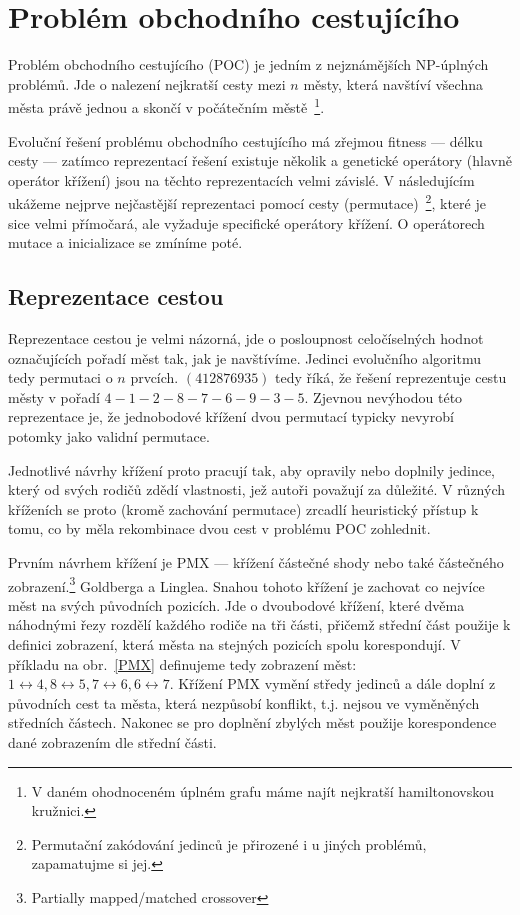 %
%

\section{Problém obchodního cestujícího}

Problém obchodního cestujícího (POC) je jedním z nejznámějších NP-úplných problémů. Jde o nalezení nejkratší cesty mezi $n$ městy, která navštíví všechna města právě jednou a skončí v počátečním městě~\footnote{V daném ohodnoceném úplném grafu máme najít nejkratší hamiltonovskou kružnici.}. 

Evoluční řešení problému obchodního cestujícího má zřejmou fitness --- délku cesty --- zatímco reprezentací řešení existuje několik a genetické operátory (hlavně operátor křížení) jsou na těchto reprezentacích velmi závislé. V následujícím ukážeme nejprve nejčastější reprezentaci pomocí cesty (permutace)~\footnote{Permutační zakódování jedinců je přirozené i u jiných problémů, zapamatujme si jej.}, které je sice velmi přímočará, ale vyžaduje specifické operátory křížení. O operátorech mutace a inicializace se zmíníme poté.   


\subsection{Reprezentace cestou}

Reprezentace cestou je velmi názorná, jde o posloupnost celočíselných hodnot označujících pořadí měst tak, jak je navštívíme. Jedinci evolučního algoritmu tedy permutaci o $n$ prvcích.  $(412876935)$ tedy říká, že řešení reprezentuje cestu městy v pořadí $4-1-2-8-7-6-9-3-5$. Zjevnou nevýhodou této reprezentace je, že jednobodové křížení dvou permutací typicky nevyrobí potomky jako validní permutace. 

Jednotlivé návrhy křížení proto pracují tak, aby opravily nebo doplnily jedince, který od svých rodičů zdědí vlastnosti, jež autoři považují za důležité. V různých kříženích se proto (kromě zachování permutace) zrcadlí heuristický přístup k tomu, co by měla rekombinace dvou cest v problému POC zohlednit. 

Prvním návrhem křížení je PMX --- křížení částečné shody nebo také částečného zobrazení.\footnote{Partially mapped/matched crossover} Goldberga a Linglea. Snahou tohoto křížení je zachovat co nejvíce měst na svých původních pozicích. Jde o dvoubodové křížení, které dvěma náhodnými řezy rozdělí každého rodiče na tři části, přičemž střední část použije k definici zobrazení, která města na stejných pozicích spolu korespondují. V příkladu na obr.~\ref{PMX} definujeme tedy zobrazení měst: $1\leftrightarrow 4, 8\leftrightarrow 5, 7\leftrightarrow 6, 6\leftrightarrow 7$. Křížení PMX vymění středy jedinců a dále doplní z původních cest ta města, která nezpůsobí konflikt, t.j. nejsou ve vyměněných středních částech. Nakonec se pro doplnění zbylých měst použije korespondence dané zobrazením dle střední části.   

